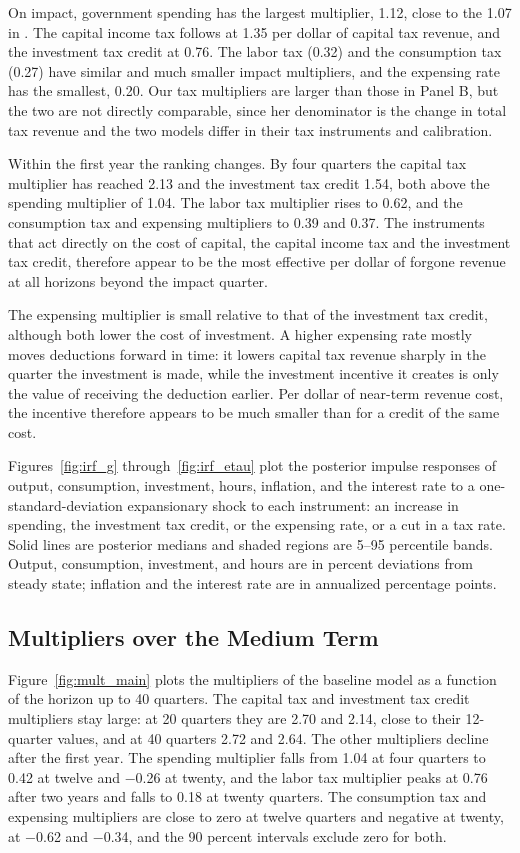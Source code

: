 \documentclass[article,11pt,letterpaper,fleqn]{article}
\theoremstyle{definition}
\numberwithin{equation}{section}
\begin{document}
On impact, government spending has the largest multiplier, 1.12, close to the 1.07 in \citet{Zubairy2014}. The capital income tax follows at 1.35 per dollar of capital tax revenue, and the investment tax credit at 0.76. The labor tax (0.32) and the consumption tax (0.27) have similar and much smaller impact multipliers, and the expensing rate has the smallest, 0.20. Our tax multipliers are larger than those in Panel B, but the two are not directly comparable, since her denominator is the change in total tax revenue and the two models differ in their tax instruments and calibration.

Within the first year the ranking changes. By four quarters the capital tax multiplier has reached 2.13 and the investment tax credit 1.54, both above the spending multiplier of 1.04. The labor tax multiplier rises to 0.62, and the consumption tax and expensing multipliers to 0.39 and 0.37. The instruments that act directly on the cost of capital, the capital income tax and the investment tax credit, therefore appear to be the most effective per dollar of forgone revenue at all horizons beyond the impact quarter.

The expensing multiplier is small relative to that of the investment tax credit, although both lower the cost of investment. A higher expensing rate mostly moves deductions forward in time: it lowers capital tax revenue sharply in the quarter the investment is made, while the investment incentive it creates is only the value of receiving the deduction earlier. Per dollar of near-term revenue cost, the incentive therefore appears to be much smaller than for a credit of the same cost.

Figures~\ref{fig:irf_g} through~\ref{fig:irf_etau} plot the posterior impulse responses of output, consumption, investment, hours, inflation, and the interest rate to a one-standard-deviation expansionary shock to each instrument: an increase in spending, the investment tax credit, or the expensing rate, or a cut in a tax rate. Solid lines are posterior medians and shaded regions are 5--95 percentile bands. Output, consumption, investment, and hours are in percent deviations from steady state; inflation and the interest rate are in annualized percentage points.

\subsection{Multipliers over the Medium Term}

Figure~\ref{fig:mult_main} plots the multipliers of the baseline model as a function of the horizon up to 40 quarters. The capital tax and investment tax credit multipliers stay large: at 20 quarters they are 2.70 and 2.14, close to their 12-quarter values, and at 40 quarters 2.72 and 2.64. The other multipliers decline after the first year. The spending multiplier falls from 1.04 at four quarters to 0.42 at twelve and $-$0.26 at twenty, and the labor tax multiplier peaks at 0.76 after two years and falls to 0.18 at twenty quarters. The consumption tax and expensing multipliers are close to zero at twelve quarters and negative at twenty, at $-$0.62 and $-$0.34, and the 90 percent intervals exclude zero for both.
\end{document}
